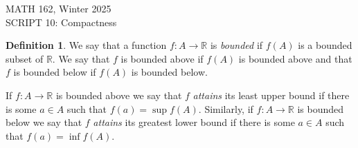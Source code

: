 \documentclass[11pt]{article}
\newcommand{\bbR}{\mathbb{R}}
\renewcommand{\_}[1]{\underline{ #1 }}
\theoremstyle{definition}
\newtheorem{definition}[theorem]{Definition}
\newcommand{\head}[1]{
	\begin{center}
		{\large #1}
		\vspace{.2 in}
	\end{center}
	
	\bigskip 
}
\numberwithin{equation}{subsection}
\begin{document}
\head{MATH 162, Winter 2025\\
 SCRIPT 10: Compactness} 






\setcounter{section}{10}   


\begin{definition}
	We say that a function $f\colon A \to \bbR$ is \emph{bounded} if $f(A)$ is a bounded subset of $\bbR$. We say that $f$ is bounded above if $f(A)$ is bounded above and that $f$ is bounded below if $f(A)$ is bounded below. 
	
	If  $f\colon A \to \bbR$ is bounded above we say that $f$ {\em attains} its least upper bound if there is some $a\in A$ such that $f(a)=\sup f(A).$ Similarly, if $f\colon A \to \bbR$ is bounded below we say that $f$ {\em attains} its greatest lower bound if there is some $a\in A$ such that $f(a)=\inf f(A).$ 
	
\end{definition}
\end{document}
